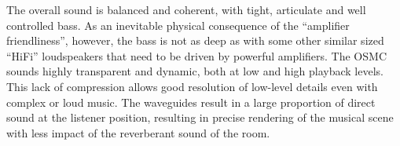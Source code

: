 \documentclass[12pt,a4paper]{article}
\begin{document}
The overall sound is balanced and coherent, with tight, articulate and well controlled bass. As an inevitable physical consequence of the ``amplifier friendliness'', however, the bass is not as deep as with some other similar sized ``HiFi'' loudspeakers that need to be driven by powerful amplifiers. The OSMC sounds highly transparent and dynamic, both at low and high playback levels. This lack of compression allows good resolution of low-level details even with complex or loud music. The waveguides result in a large proportion of direct sound at the listener position, resulting in precise rendering of the musical scene with less impact of the reverberant sound of the room.

\clearpage



\end{document}
